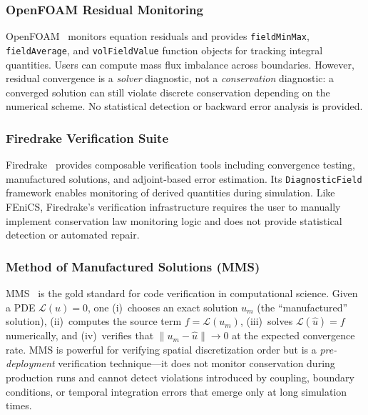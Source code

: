 \documentclass[11pt,a4paper]{article}
\begin{document}
\subsubsection{OpenFOAM Residual Monitoring}
OpenFOAM~\citep{openfoam2007} monitors equation residuals and provides \texttt{fieldMinMax}, \texttt{fieldAverage}, and \texttt{volFieldValue} function objects for tracking integral quantities. Users can compute mass flux imbalance across boundaries. However, residual convergence is a \emph{solver} diagnostic, not a \emph{conservation} diagnostic: a converged solution can still violate discrete conservation depending on the numerical scheme. No statistical detection or backward error analysis is provided.

\subsubsection{Firedrake Verification Suite}
Firedrake~\citep{firedrake2016} provides composable verification tools including convergence testing, manufactured solutions, and adjoint-based error estimation. Its \texttt{DiagnosticField} framework enables monitoring of derived quantities during simulation. Like FEniCS, Firedrake's verification infrastructure requires the user to manually implement conservation law monitoring logic and does not provide statistical detection or automated repair.

\subsubsection{Method of Manufactured Solutions (MMS)}
MMS~\citep{roache2002,salari2000} is the gold standard for code verification in computational science. Given a PDE $\mathcal{L}(u) = 0$, one (i)~chooses an exact solution $u_m$ (the ``manufactured'' solution), (ii)~computes the source term $f = \mathcal{L}(u_m)$, (iii)~solves $\mathcal{L}(\hat{u}) = f$ numerically, and (iv)~verifies that $\|u_m - \hat{u}\| \to 0$ at the expected convergence rate. MMS is powerful for verifying spatial discretization order but is a \emph{pre-deployment} verification technique---it does not monitor conservation during production runs and cannot detect violations introduced by coupling, boundary conditions, or temporal integration errors that emerge only at long simulation times.
\end{document}
